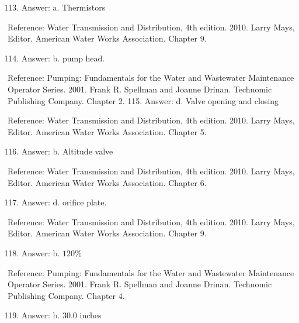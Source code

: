 \documentclass[10pt]{article}
\begin{document}
\begin{enumerate}
  \setcounter{enumi}{112}
  \item Answer: a. Thermistors
\end{enumerate}

Reference: Water Transmission and Distribution, 4th edition. 2010. Larry Mays, Editor. American Water Works Association. Chapter 9.

\begin{enumerate}
  \setcounter{enumi}{113}
  \item Answer: b. pump head.
\end{enumerate}

Reference: Pumping: Fundamentals for the Water and Wastewater Maintenance Operator Series. 2001. Frank R. Spellman and Joanne Drinan. Technomic Publishing Company. Chapter 2. 115. Answer: d. Valve opening and closing

Reference: Water Transmission and Distribution, 4th edition. 2010. Larry Mays, Editor. American Water Works Association. Chapter 5.

\begin{enumerate}
  \setcounter{enumi}{115}
  \item Answer: b. Altitude valve
\end{enumerate}

Reference: Water Transmission and Distribution, 4th edition. 2010. Larry Mays, Editor. American Water Works Association. Chapter 6.

\begin{enumerate}
  \setcounter{enumi}{116}
  \item Answer: d. orifice plate.
\end{enumerate}

Reference: Water Transmission and Distribution, 4th edition. 2010. Larry Mays, Editor. American Water Works Association. Chapter 9.

\begin{enumerate}
  \setcounter{enumi}{117}
  \item Answer: b. $120 \%$
\end{enumerate}

Reference: Pumping: Fundamentals for the Water and Wastewater Maintenance Operator Series. 2001. Frank R. Spellman and Joanne Drinan. Technomic Publishing Company. Chapter 4.

\begin{enumerate}
  \setcounter{enumi}{118}
  \item Answer: b. $30.0$ inches
\end{enumerate}
\end{document}
